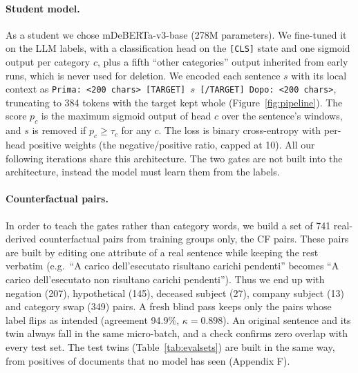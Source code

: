 \documentclass[11pt]{article}
\begin{document}
\paragraph{Student model.} As a student we chose mDeBERTa-v3-base (278M parameters). We fine-tuned it on the LLM labels, with a classification head on the \texttt{[CLS]} state and one sigmoid output per category $c$, plus a fifth ``other categories'' output inherited from early runs, which is never used for deletion. We encoded each sentence $s$ with its local context as \texttt{Prima: <200 chars> [TARGET] $s$ [/TARGET] Dopo: <200 chars>}, truncating to 384 tokens with the target kept whole (Figure~\ref{fig:pipeline}). The score $p_c$ is the maximum sigmoid output of head $c$ over the sentence's windows, and $s$ is removed if $p_c \geq \tau_c$ for any $c$. The loss is binary cross-entropy with per-head positive weights (the negative/positive ratio, capped at 10). All our following iterations share this architecture. The two gates are not built into the architecture, instead the model must learn them from the labels.

\paragraph{Counterfactual pairs.} In order to teach the gates rather than category words, we build a set of 741 real-derived counterfactual pairs from training groups only, the CF pairs. These pairs are built by editing one attribute of a real sentence while keeping the rest verbatim (e.g.\ ``A carico dell'esecutato risultano carichi pendenti'' becomes ``A carico dell'esecutato non risultano carichi pendenti''). Thus we end up with negation (207), hypothetical (145), deceased subject (27), company subject (13) and category swap (349) pairs. A fresh blind pass keeps only the pairs whose label flips as intended (agreement 94.9\%, $\kappa=0.898$). An original sentence and its twin always fall in the same micro-batch, and a check confirms zero overlap with every test set. The test twins (Table~\ref{tab:evalsets}) are built in the same way, from positives of documents that no model has seen (Appendix F).
\end{document}
